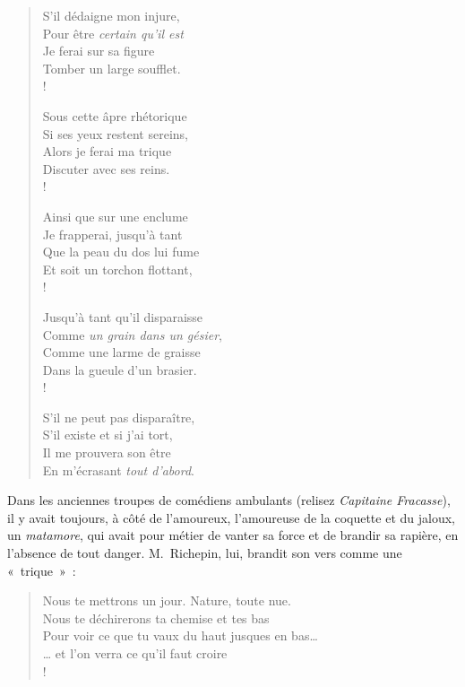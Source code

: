 \documentclass[french,twoside]{book} %
\begin{document}
{\begin{verse}
S’il dédaigne mon injure,\\
Pour être \emph{certain qu’il est}\\
Je ferai sur sa figure\\
Tomber un large soufflet.\\!

Sous cette âpre rhétorique\\
Si ses yeux restent sereins,\\
Alors je ferai ma trique\\
Discuter avec ses reins.\\!

Ainsi que sur une enclume\\
Je frapperai, jusqu’à tant\\
Que la peau du dos lui fume\\
Et soit un torchon flottant,\\!

Jusqu’à tant qu’il disparaisse\\
Comme \emph{un grain dans un gésier},\\
Comme une larme de graisse\\
Dans la gueule d’un brasier.\\!

S’il ne peut pas disparaître,\\
S’il existe et si j’ai tort,\\
Il me prouvera son être\\
En m’écrasant {\itshape tout d’abord}.\\
\end{verse}
\par
\noindent Dans les anciennes troupes de comédiens ambulants (relisez \emph{Capitaine Fracasse}), il y avait toujours, à côté de l’amoureux, l’amoureuse de la coquette et du jaloux, un \emph{matamore}, qui avait pour métier de vanter sa force et de brandir sa rapière, en l’absence de tout danger. M. Richepin, lui, brandit son vers comme une « trique » :\par

\begin{verse}
Nous te mettrons un jour. Nature, toute nue.\\
Nous te déchirerons ta chemise et tes bas\\
Pour voir ce que tu vaux du haut jusques en bas…\\
… et l’on verra ce qu’il faut croire\\!


\end{verse}}
\end{document}
